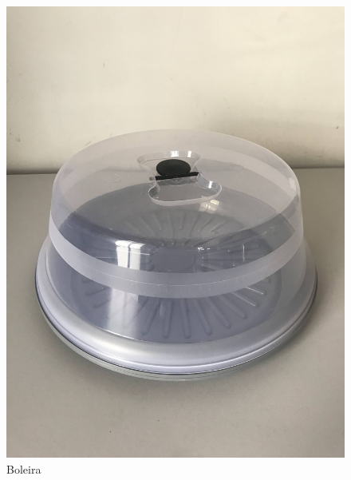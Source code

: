 \documentclass[
	12pt,				%
	openright,			%
	oneside,			%
	a4paper,			%
	chapter=TITLE,		%
	english,			%
	brazil				%
	]{abntex2}
\begin{document}
\begin{figure}[H]
    \centering
    \includegraphics[scale=0.04, angle=-90]{imagens/IMG_0597.jpg}
    \caption{Boleira}
    \label{fig:boleira}
\end{figure}   
\end{document}
